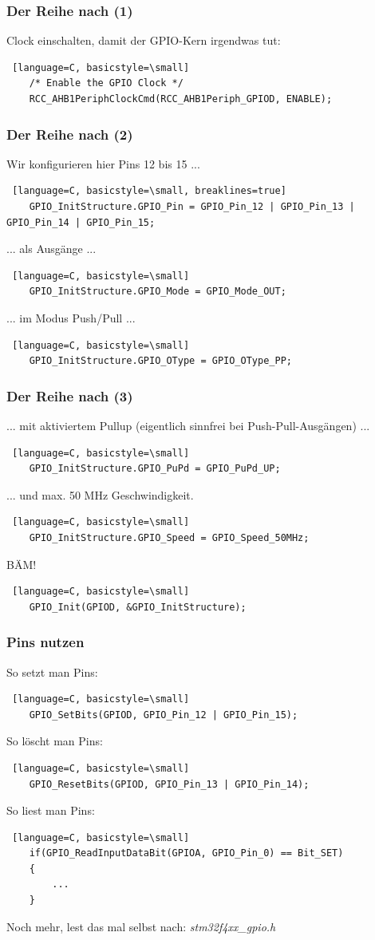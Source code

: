 \documentclass[ngerman,compress]{beamer}
\begin{document}
\begin{frame} [fragile]
	\frametitle{Der Reihe nach (1)}
	Clock einschalten, damit der GPIO-Kern irgendwas tut:
	\begin{lstlisting} [language=C, basicstyle=\small]
	/* Enable the GPIO Clock */
	RCC_AHB1PeriphClockCmd(RCC_AHB1Periph_GPIOD, ENABLE);
	\end{lstlisting}
\end{frame}

\begin{frame} [fragile]
	\frametitle{Der Reihe nach (2)}
	Wir konfigurieren hier Pins 12 bis 15 ...
	\begin{lstlisting} [language=C, basicstyle=\small, breaklines=true]
	GPIO_InitStructure.GPIO_Pin = GPIO_Pin_12 | GPIO_Pin_13 | GPIO_Pin_14 | GPIO_Pin_15;
	\end{lstlisting}
	\pause
	... als Ausgänge ...
	\begin{lstlisting} [language=C, basicstyle=\small]
	GPIO_InitStructure.GPIO_Mode = GPIO_Mode_OUT;
	\end{lstlisting}
	\pause
	... im Modus Push/Pull ...
	\begin{lstlisting} [language=C, basicstyle=\small]
	GPIO_InitStructure.GPIO_OType = GPIO_OType_PP;
	\end{lstlisting}
\end{frame}

\begin{frame} [fragile]
	\frametitle{Der Reihe nach (3)}
	... mit aktiviertem Pullup (eigentlich sinnfrei bei Push-Pull-Ausgängen) ...
	\begin{lstlisting} [language=C, basicstyle=\small]
	GPIO_InitStructure.GPIO_PuPd = GPIO_PuPd_UP;
	\end{lstlisting}
	\pause
	... und max. 50 MHz Geschwindigkeit.
	\begin{lstlisting} [language=C, basicstyle=\small]
	GPIO_InitStructure.GPIO_Speed = GPIO_Speed_50MHz;
	\end{lstlisting}
	\pause
	BÄM!
	\begin{lstlisting} [language=C, basicstyle=\small]
	GPIO_Init(GPIOD, &GPIO_InitStructure);
	\end{lstlisting}
\end{frame}

\begin{frame} [fragile]
	\frametitle{Pins nutzen}
	So setzt man Pins:
	\begin{lstlisting} [language=C, basicstyle=\small]
	GPIO_SetBits(GPIOD, GPIO_Pin_12 | GPIO_Pin_15);
	\end{lstlisting}
	\pause
	So löscht man Pins:
	\begin{lstlisting} [language=C, basicstyle=\small]
	GPIO_ResetBits(GPIOD, GPIO_Pin_13 | GPIO_Pin_14);
	\end{lstlisting}
	\pause
	So liest man Pins:
	\begin{lstlisting} [language=C, basicstyle=\small]
	if(GPIO_ReadInputDataBit(GPIOA, GPIO_Pin_0) == Bit_SET)
	{
		...
	}
	\end{lstlisting}
	Noch mehr, lest das mal selbst nach: \emph{stm32f4xx\_gpio.h}
\end{frame}
\end{document}
